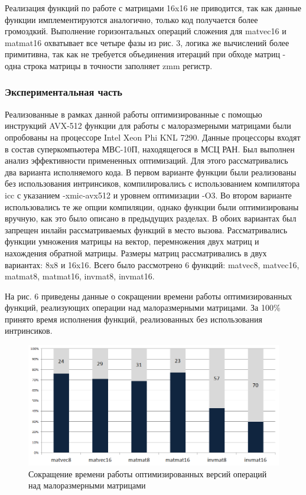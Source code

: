 Реализация функций по работе с матрицами 16x16 не приводится, так как данные функции имплементируются аналогично, только код получается более громоздкий.
Выполнение горизонтальных операций сложения для matvec16 и matmat16 охватывает все четыре фазы из рис. 3, логика же вычислений более примитивна, так как не требуется объединения итераций при обходе матриц - одна строка матрицы в точности заполняет zmm регистр.

\subsubsection{Экспериментальная часть}

Реализованные в рамках данной работы оптимизированные с помощью инструкций AVX-512 функции для работы с малоразмерными матрицами были опробованы на процессоре Intel Xeon Phi KNL 7290.
Данные процессоры входят в состав суперкомпьютера МВС-10П, находящегося в МСЦ РАН.
Был выполнен анализ эффективности примененных оптимизаций.
Для этого рассматривались два варианта исполняемого кода. В первом варианте функции были реализованы без использования интринсиков, компилировались с использованием компилятора icc с указанием -xmic-avx512 и уровнем оптимизации -O3.
Во втором варианте использовались те же опции компиляции, однако функции были оптимизированы вручную, как это было описано в предыдущих разделах.
В обоих вариантах был запрещен инлайн рассматриваемых функций в место вызова.
Рассматривались функции умножения матрицы на вектор, перемножения двух матриц и нахождения обратной матрицы.
Размеры матриц рассматривались в двух вариантах: 8x8 и 16x16.
Всего было рассмотрено 6 функций: matvec8, matvec16, matmat8, matmat16, invmat8, invmat16. 

На рис. 6 приведены данные о сокращении времени работы оптимизированных функций, реализующих операции над малоразмерными матрицами.
За 100\% принято время исполнения функций, реализованных без использования интринсиков.

\begin{figure}[ht]
	\centering
		\includegraphics[width=1.00\textwidth]{./pics/text_4_small_matr/res.png}
	\caption{Сокращение времени работы оптимизированных версий операций над малоразмерными матрицами}
	\label{fig:text_4_small_matr_res}
\end{figure}

